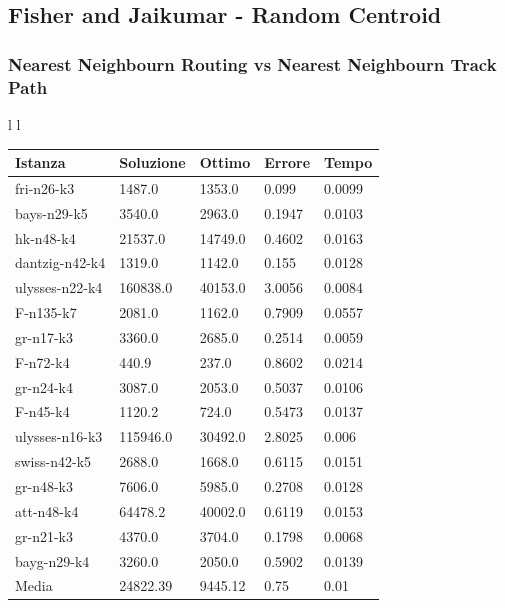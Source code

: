 \documentclass[]{article}
\begin{document}
\subsection{Fisher and Jaikumar - Random Centroid}

\subsubsection{Nearest Neighbourn Routing vs Nearest Neighbourn Track Path }

\begin{tabular}{l l}
	\small	
	\begin{tabular}{||l | l l l l||} 
		\hline
		Istanza & Soluzione & Ottimo & Errore & Tempo \\ [0.5ex] 
		\hline\hline
		fri-n26-k3 & 1487.0 & 1353.0 & 0.099 & 0.0099  \\
		bays-n29-k5 & 3540.0 & 2963.0 & 0.1947 & 0.0103  \\
		hk-n48-k4 & 21537.0 & 14749.0 & 0.4602 & 0.0163  \\
		dantzig-n42-k4 & 1319.0 & 1142.0 & 0.155 & 0.0128  \\
		ulysses-n22-k4 & 160838.0 & 40153.0 & 3.0056 & 0.0084  \\
		F-n135-k7 & 2081.0 & 1162.0 & 0.7909 & 0.0557  \\
		gr-n17-k3 & 3360.0 & 2685.0 & 0.2514 & 0.0059  \\
		F-n72-k4 & 440.9 & 237.0 & 0.8602 & 0.0214  \\
		gr-n24-k4 & 3087.0 & 2053.0 & 0.5037 & 0.0106  \\
		F-n45-k4 & 1120.2 & 724.0 & 0.5473 & 0.0137  \\
		ulysses-n16-k3 & 115946.0 & 30492.0 & 2.8025 & 0.006  \\
		swiss-n42-k5 & 2688.0 & 1668.0 & 0.6115 & 0.0151  \\
		gr-n48-k3 & 7606.0 & 5985.0 & 0.2708 & 0.0128  \\
		att-n48-k4 & 64478.2 & 40002.0 & 0.6119 & 0.0153  \\
		gr-n21-k3 & 4370.0 & 3704.0 & 0.1798 & 0.0068  \\
		bayg-n29-k4 & 3260.0 & 2050.0 & 0.5902 & 0.0139  \\
		\hline
		Media & 24822.39 & 9445.12 & 0.75 & 0.01  \\			
		[1ex] 
		\hline
	\end{tabular}
	

\end{tabular}
\end{document}

